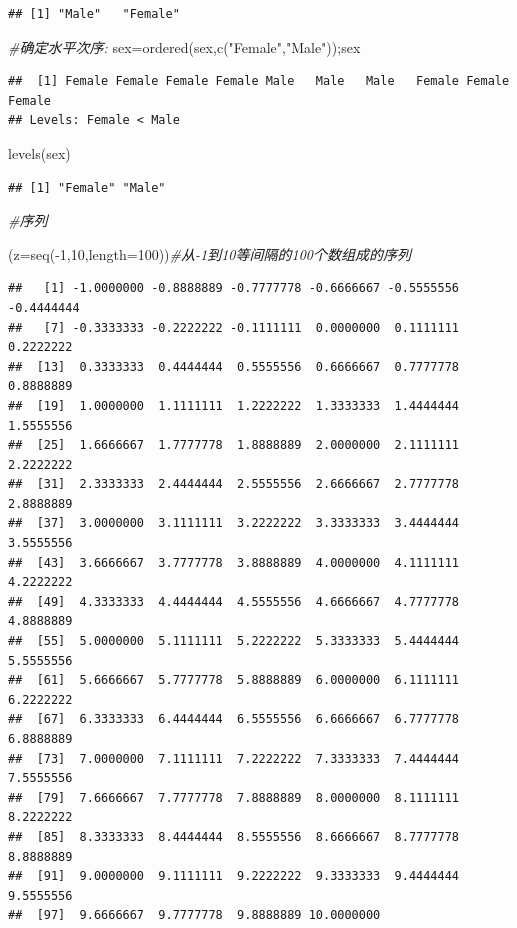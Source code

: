\documentclass[
]{book}
\newenvironment{Shaded}{\begin{snugshade}}{\end{snugshade}}
\newcommand{\AttributeTok}[1]{\textcolor[rgb]{0.77,0.63,0.00}{#1}}
\newcommand{\CommentTok}[1]{\textcolor[rgb]{0.56,0.35,0.01}{\textit{#1}}}
\newcommand{\DecValTok}[1]{\textcolor[rgb]{0.00,0.00,0.81}{#1}}
\newcommand{\FunctionTok}[1]{\textcolor[rgb]{0.00,0.00,0.00}{#1}}
\newcommand{\NormalTok}[1]{#1}
\newcommand{\OtherTok}[1]{\textcolor[rgb]{0.56,0.35,0.01}{#1}}
\newcommand{\SpecialCharTok}[1]{\textcolor[rgb]{0.00,0.00,0.00}{#1}}
\newcommand{\StringTok}[1]{\textcolor[rgb]{0.31,0.60,0.02}{#1}}
\begin{document}
\begin{verbatim}
## [1] "Male"   "Female"
\end{verbatim}

\begin{Shaded}
\begin{Highlighting}[]
\CommentTok{\#确定水平次序:}
\NormalTok{sex}\OtherTok{=}\FunctionTok{ordered}\NormalTok{(sex,}\FunctionTok{c}\NormalTok{(}\StringTok{"Female"}\NormalTok{,}\StringTok{"Male"}\NormalTok{));sex}
\end{Highlighting}
\end{Shaded}

\begin{verbatim}
##  [1] Female Female Female Female Male   Male   Male   Female Female Female
## Levels: Female < Male
\end{verbatim}

\begin{Shaded}
\begin{Highlighting}[]
\FunctionTok{levels}\NormalTok{(sex)}
\end{Highlighting}
\end{Shaded}

\begin{verbatim}
## [1] "Female" "Male"
\end{verbatim}

\begin{Shaded}
\begin{Highlighting}[]
\CommentTok{\#序列}

\NormalTok{(}\AttributeTok{z=}\FunctionTok{seq}\NormalTok{(}\SpecialCharTok{{-}}\DecValTok{1}\NormalTok{,}\DecValTok{10}\NormalTok{,}\AttributeTok{length=}\DecValTok{100}\NormalTok{))}\CommentTok{\#从{-}1到10等间隔的100个数组成的序列}
\end{Highlighting}
\end{Shaded}

\begin{verbatim}
##   [1] -1.0000000 -0.8888889 -0.7777778 -0.6666667 -0.5555556 -0.4444444
##   [7] -0.3333333 -0.2222222 -0.1111111  0.0000000  0.1111111  0.2222222
##  [13]  0.3333333  0.4444444  0.5555556  0.6666667  0.7777778  0.8888889
##  [19]  1.0000000  1.1111111  1.2222222  1.3333333  1.4444444  1.5555556
##  [25]  1.6666667  1.7777778  1.8888889  2.0000000  2.1111111  2.2222222
##  [31]  2.3333333  2.4444444  2.5555556  2.6666667  2.7777778  2.8888889
##  [37]  3.0000000  3.1111111  3.2222222  3.3333333  3.4444444  3.5555556
##  [43]  3.6666667  3.7777778  3.8888889  4.0000000  4.1111111  4.2222222
##  [49]  4.3333333  4.4444444  4.5555556  4.6666667  4.7777778  4.8888889
##  [55]  5.0000000  5.1111111  5.2222222  5.3333333  5.4444444  5.5555556
##  [61]  5.6666667  5.7777778  5.8888889  6.0000000  6.1111111  6.2222222
##  [67]  6.3333333  6.4444444  6.5555556  6.6666667  6.7777778  6.8888889
##  [73]  7.0000000  7.1111111  7.2222222  7.3333333  7.4444444  7.5555556
##  [79]  7.6666667  7.7777778  7.8888889  8.0000000  8.1111111  8.2222222
##  [85]  8.3333333  8.4444444  8.5555556  8.6666667  8.7777778  8.8888889
##  [91]  9.0000000  9.1111111  9.2222222  9.3333333  9.4444444  9.5555556
##  [97]  9.6666667  9.7777778  9.8888889 10.0000000
\end{verbatim}
\end{document}
